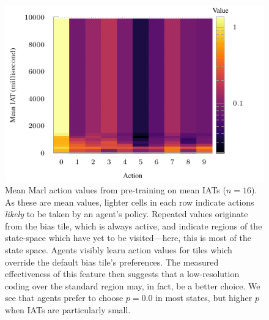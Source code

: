 \documentclass[conference, letterpaper, 10pt, times]{IEEEtran}
\begin{document}
\begin{figure}
	\centering
	\includegraphics[width=0.9\linewidth]{../plots/policy-16-tcp-f5-mean-log}
	
	\caption{
		Mean Marl action values from pre-training on mean IATs ($n=16$).
		As these are mean values, lighter cells in each row indicate actions \emph{likely} to be taken by an agent's policy.
		Repeated values originate from the bias tile, which is always active, and indicate regions of the state-space which have yet to be visited---here, this is most of the state space.
		Agents visibly learn action values for tiles which override the default bias tile's preferences.
		The measured effectiveness of this feature then suggests that a low-resolution coding over the standard region may, in fact, be a better choice.
		We see that agents prefer to choose $p=0.0$ in most states, but higher $p$ when IATs are particularly small.
		\label{fig:intern-16-tcp-iat}
	}
\end{figure}
\end{document}
